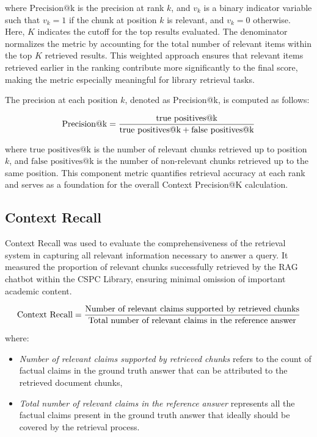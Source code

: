 \begin{refsection}
where $\text{Precision@k}$ is the precision at rank $k$, and $v_k$ is a binary indicator variable such that $v_k = 1$ if the chunk at position $k$ is relevant, and $v_k = 0$ otherwise. Here, $K$ indicates the cutoff for the top results evaluated. The denominator normalizes the metric by accounting for the total number of relevant items within the top $K$ retrieved results. This weighted approach ensures that relevant items retrieved earlier in the ranking contribute more significantly to the final score, making the metric especially meaningful for library retrieval tasks.

The precision at each position $k$, denoted as Precision@k, is computed as follows:

\begin{equation}
\centering
\text{Precision@k} = 
\frac{
    \text{true positives@k}
}{
    \text{true positives@k} + \text{false positives@k}
}
\end{equation}

where $\text{true positives@k}$ is the number of relevant chunks retrieved up to position $k$, and $\text{false positives@k}$ is the number of non-relevant chunks retrieved up to the same position. This component metric quantifies retrieval accuracy at each rank and serves as a foundation for the overall Context Precision@K calculation.

\subsection*{Context Recall}

Context Recall was used to evaluate the comprehensiveness of the retrieval system in capturing all relevant information necessary to answer a query. It measured the proportion of relevant chunks successfully retrieved by the RAG chatbot within the CSPC Library, ensuring minimal omission of important academic content.

\begin{equation}
\centering
\text{Context Recall} = \frac{\text{Number of relevant claims supported by retrieved chunks}}{\text{Total number of relevant claims in the reference answer}}
\end{equation}

where:

\begin{itemize}
    \item \textit{Number of relevant claims supported by retrieved chunks} refers to the count of factual claims in the ground truth answer that can be attributed to the retrieved document chunks,
    \item \textit{Total number of relevant claims in the reference answer} represents all the factual claims present in the ground truth answer that ideally should be covered by the retrieval process.
\end{itemize}


\end{refsection}
